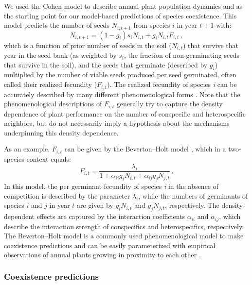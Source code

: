 \begin{refsection}
We used the Cohen model \citep{cohen1966optimizing,watkinson_density-dependence_1980} to describe annual-plant population dynamics and as the starting point for our model-based predictions of species coexistence. This model predicts the number of seeds $N_{i,t+1}$ from species $i$ in year $t+1$ with:
\begin{equation}
\label{annual_plant}
    N_{i,t+1}= (1-g_i)s_{i} N_{i,t}  + g_{i} N_{i,t}F_{i,t}\,,
\end{equation}
which is a function of prior number of seeds in the soil ($N_{i,t}$) that survive that year in the seed bank (as weighted by $s_{i}$, the fraction of non-germinating seeds that survive in the soil), and the seeds that germinate (described by $g_i$) multiplied by the number of viable seeds produced per seed germinated, often called their realized fecundity ($F_{i,t}$). The realized fecundity of species \textit{i} can be accurately described by many different phenomenological forms \citep{law_response-surface_1987, godwin2020empiricist}. Note that the phenomenological descriptions of $F_{i,t}$ generally try to capture the density dependence of plant performance on the number of conspecific and heterospecific neighbors, but do not necessarily imply a hypothesis about the mechanisms underpinning this density dependence.

As an example, $F_{i,t}$ can be given by the Beverton--Holt model \citep{beverton1954notes}, which in a two-species context equals:
 \begin{equation}
 \label{Beverton-Holt}
    F_{i,t} = \frac{\lambda_{i}}{1 + \alpha_{ii}g_{i}N_{i,t} + \alpha_{ij}g_{j}N_{j,t}}\,.
\end{equation}
In this model, the per germinant fecundity of species \textit{i} in the absence of competition is described by the parameter $\lambda_{i}$, while the numbers of germinants of species $i$ and $j$ in year $t$ are given by $g_{i}N_{i,t}$ and $g_{j}N_{j,t}$, respectively. The density-dependent effects are captured by the interaction coefficients $\alpha_{ii}$ and $\alpha_{ij}$, which describe the interaction strength of conspecifics and heterospecifics, respectively. The Beverton--Holt model is a commonly used phenomenological model to make coexistence predictions and can be easily parameterized with empirical observations of annual plants growing in proximity to each other \citep{godoy_phenology_2014, godoy_phylogenetic_2014, levine2009importance}.

\subsubsection*{Coexistence predictions}


\end{refsection}
